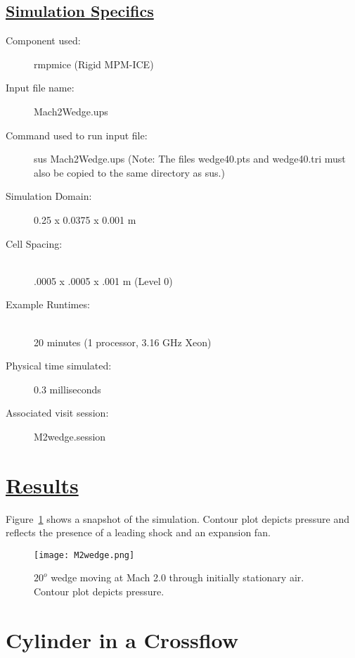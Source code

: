 \subsection*{\underline{Simulation Specifics}}
\begin{description}
\item [Component used:] \hfill rmpmice (Rigid MPM-ICE)
\item [Input file name:] \hfill Mach2Wedge.ups
\item [Command used to run input file:]\hfill sus Mach2Wedge.ups
(Note: The files wedge40.pts and wedge40.tri must also be copied to
the same directory as sus.)

\item [Simulation Domain:]\hfill    0.25 x 0.0375 x 0.001 m

\item [Cell Spacing:]\hfill \\
.0005 x .0005 x .001 m (Level 0)

\item [Example Runtimes:] \hfill \\
 20 minutes   (1 processor, 3.16 GHz Xeon)\\

\item [Physical time simulated:] \hfill 0.3 milliseconds

\item [Associated visit session:] \hfill M2wedge.session

\end{description}

\newpage

\section*{\underline{Results}}

Figure~\ref{figwedge} shows a snapshot of the simulation.  Contour
plot depicts pressure and reflects the presence of a leading shock
and an expansion fan.
\begin{figure}
  \center
  \texttt{[image: M2wedge.png]}

  \caption{$20^o$ wedge moving at Mach 2.0 through initially stationary
air.  Contour plot depicts pressure.}
  \label{figwedge}
\end{figure}
\newpage
%
\section*{\center Cylinder in a Crossflow}
